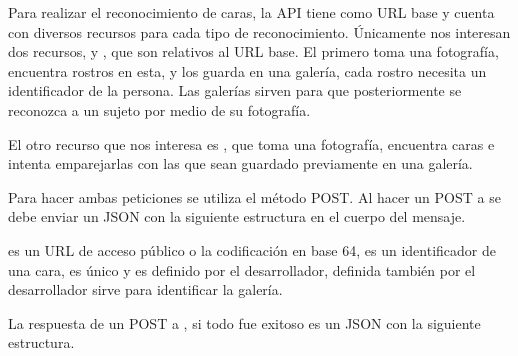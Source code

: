 Para realizar el reconocimiento de caras, la API tiene como URL base
 y cuenta con diversos recursos para cada tipo de
reconocimiento. Únicamente nos interesan dos recursos,  y
, que son relativos al URL base.
El primero toma una fotografía, encuentra rostros en esta,
y los guarda en una galería, cada rostro necesita un identificador de la
persona. Las galerías sirven para que posteriormente se reconozca a un sujeto
por medio de su fotografía.

El otro recurso que nos interesa es , que toma una fotografía,
encuentra caras e intenta emparejarlas con las que sean guardado
previamente en una galería.

Para hacer ambas peticiones se utiliza el método POST. Al hacer un POST
a  se debe enviar un JSON con la siguiente estructura en el cuerpo
del mensaje.

\begin{sphinxVerbatim}[commandchars=\\\{\}]
   
   
   
\end{sphinxVerbatim}

 es un URL de acceso público o la codificación en base 64,  es un identificador
de una cara, es único y es definido por el desarrollador, 
definida también por el desarrollador sirve para identificar la galería.

La respuesta de un POST a , si todo fue exitoso
es un JSON con la siguiente estructura.

